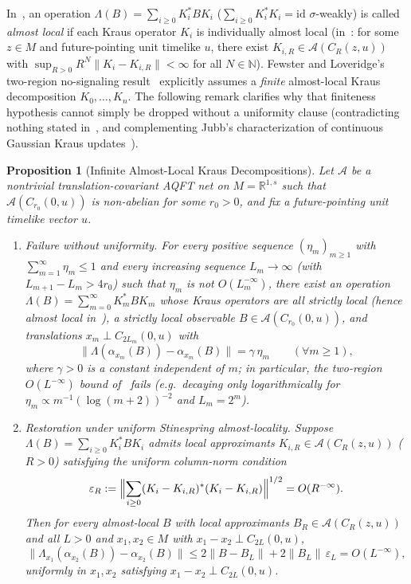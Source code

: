 \documentclass[11pt,a4paper]{article}
\newtheorem{proposition}[theorem]{Proposition}
\theoremstyle{definition}
\theoremstyle{remark}
\newcommand{\Ac}{\mathcal{A}}
\newcommand{\RR}{\mathbb{R}}
\newcommand{\NN}{\mathbb{N}}
\newcommand{\id}{\mathrm{id}}
\newcommand{\norm}[1]{\|#1\|}
\begin{document}
In~\cite[Def.~4.3]{FewsterLoveridge2026}, an operation $\Lambda(B)=\sum_{i\ge 0}K_i^* B K_i$ ($\sum_{i\ge 0} K_i^* K_i = \id$ $\sigma$-weakly) is called \emph{almost local} if each Kraus operator $K_i$ is individually almost local (in~\cite[Def.~3.3]{FewsterLoveridge2026}: for some $z\in M$ and future-pointing unit timelike $u$, there exist $K_{i,R}\in\Ac(C_R(z,u))$ with $\sup_{R>0}R^N\norm{K_i-K_{i,R}}<\infty$ for all $N\in\NN$). Fewster and Loveridge's two-region no-signaling result~\cite[Prop.~4.4(ii)]{FewsterLoveridge2026} explicitly assumes a \emph{finite} almost-local Kraus decomposition $K_0,\dots,K_n$. The following remark clarifies why that finiteness hypothesis cannot simply be dropped without a uniformity clause (contradicting nothing stated in~\cite{FewsterLoveridge2026}, and complementing Jubb's characterization of continuous Gaussian Kraus updates~\cite{Jubb2022}).

\begin{proposition}[Infinite Almost-Local Kraus Decompositions]\label{prop:kraus}
Let $\Ac$ be a nontrivial translation-covariant AQFT net on $M=\RR^{1,s}$ such that $\Ac(C_{r_0}(0,u))$ is non-abelian for some $r_0>0$, and fix a future-pointing unit timelike vector $u$.
\begin{enumerate}[label=\textup{(\alph*)},leftmargin=*]
\item \emph{Failure without uniformity.} For every positive sequence $(\eta_m)_{m\ge 1}$ with $\sum_{m=1}^\infty \eta_m \le 1$ and every increasing sequence $L_m\to\infty$ (with $L_{m+1}-L_m > 4r_0$) such that $\eta_m$ is not $O(L_m^{-\infty})$, there exist an operation $\Lambda(B)=\sum_{m=0}^\infty K_m^* B K_m$ whose Kraus operators are all strictly local (hence almost local in~\cite[Def.~4.3]{FewsterLoveridge2026}), a strictly local observable $B\in\Ac(C_{r_0}(0,u))$, and translations $x_m\perp C_{2L_m}(0,u)$ with
\[
\norm{\Lambda(\alpha_{x_m}(B)) - \alpha_{x_m}(B)} = \gamma\,\eta_m \qquad (\forall m\ge 1),
\]
where $\gamma > 0$ is a constant independent of $m$; in particular, the two-region $O(L^{-\infty})$ bound of~\cite[Prop.~4.4(ii)]{FewsterLoveridge2026} fails (e.g.\ decaying only logarithmically for $\eta_m \propto m^{-1}(\log(m+2))^{-2}$ and $L_m = 2^m$).
\item \emph{Restoration under uniform Stinespring almost-locality.} Suppose $\Lambda(B) = \sum_{i\ge 0} K_i^* B K_i$ admits local approximants $K_{i,R}\in\Ac(C_R(z,u))$ ($R>0$) satisfying the uniform column-norm condition
\begin{equation}\label{eq:stinespring-al}
\varepsilon_R := \Bigl\|\sum_{i\ge 0} (K_i - K_{i,R})^*(K_i - K_{i,R})\Bigr\|^{1/2} = O(R^{-\infty}).
\end{equation}
Then for every almost-local $B$ with local approximants $B_R\in\Ac(C_R(z,u))$ and all $L>0$ and $x_1,x_2\in M$ with $x_1 - x_2 \perp C_{2L}(0,u)$,
\begin{equation}\label{eq:sharp-kraus}
\norm{\Lambda_{x_1}(\alpha_{x_2}(B)) - \alpha_{x_2}(B)} \le 2\norm{B - B_L} + 2\norm{B_L}\,\varepsilon_L = O(L^{-\infty}),
\end{equation}
uniformly in $x_1,x_2$ satisfying $x_1-x_2\perp C_{2L}(0,u)$.
\end{enumerate}
\end{proposition}
\end{document}
